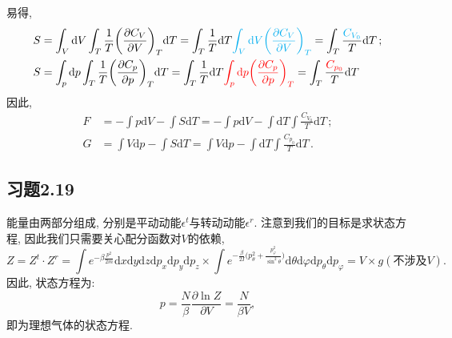 \documentclass[letterpaper, 10pt]{article}
\newcommand{\dd}{\mathrm{d}}
\begin{document}
\begin{itemize}
	易得, 
	\begin{align*}
	S & = \int_{V} \dd V \int_{T} \frac{1}{T} \bigg( \frac{\partial C_{V}}{\partial V} \bigg)_{T} \dd T = 
	\int_{T} \frac{1}{T} \dd T {\color{cyan}{\int_{V} \dd V \bigg( \frac{\partial C_{V}}{\partial V} \bigg)_{T}}} = \int_{T} \frac{{\color{cyan}{C_{V_{0}}}}}{T} \dd T \,; \\
	S & = \int_{p} \dd p \int_{T} \frac{1}{T} \bigg( \frac{\partial C_{p}}{\partial p} \bigg)_{T} \dd T = 
	\int_{T} \frac{1}{T} \dd T {\color{red}{\int_{p} \dd p \bigg( \frac{\partial C_{p}}{\partial p} \bigg)_{T}}} = \int_{T} \frac{{\color{red}{C_{p_{0}}}}}{T} \dd T \,
	\end{align*}
	因此,
	\begin{align*}
	F & = - \int p \dd V - \int S \dd T = - \int p \dd V - \int \dd T \int \frac{C_{V_{0}}}{T} \dd T \,; \\
	G & = \int V \dd p - \int S \dd T = \int V \dd p - \int \dd T \int \frac{C_{p_{0}}}{T} \dd T \,.
	\end{align*}
\end{itemize}

\subsection{习题2.19}
能量由两部分组成, 分别是平动动能$\epsilon^{t}$与转动动能$\epsilon^{r}$. 注意到我们的目标是求状态方程, 因此我们只需要关心配分函数对$V$的依赖,
\[ Z = Z^{t} \cdot Z^{r} = \int e^{-\beta \frac{p^2}{2m}} \dd x \dd y \dd z \dd p_{x} \dd p_{y} \dd p_{z} \times 
\int e^{- \frac{\beta}{2I} \big( p_{\theta}^2 + \frac{p_{\varphi}^2}{\sin^2\!\theta} \big)} \dd \theta \dd \varphi \dd p_{\theta} \dd p_{\varphi} = V \times g(\text{不涉及$V$}).
\]
因此, 状态方程为:
\[ p = \frac{N}{\beta} \frac{\partial \ln Z}{\partial V} = \frac{N}{\beta V}, \]
即为理想气体的状态方程.
\end{document}
